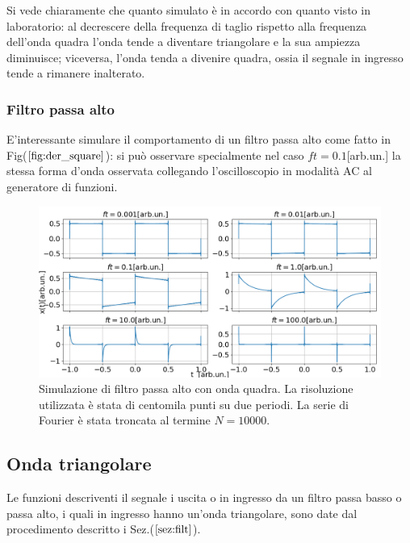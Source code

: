 \documentclass{article}
\begin{document}
                \noindent Si vede chiaramente che quanto simulato è in accordo con quanto
                visto in laboratorio: 
                al decrescere della frequenza di taglio rispetto alla frequenza dell'onda quadra
                l'onda tende a diventare triangolare e la sua ampiezza diminuisce; viceversa,
                l'onda tenda a divenire quadra, ossia il segnale in ingresso tende a 
                rimanere inalterato.
            
            
            \subsubsection{Filtro passa alto}
                E'interessante simulare il comportamento di un filtro passa alto 
                come fatto in Fig($\ref{fig:der_square}$): si  può osservare specialmente 
                nel caso $ft=0.1$[arb.un.] la stessa forma d'onda osservata collegando 
                l'oscilloscopio in modalità AC al generatore di funzioni.
                    \begin{figure}[H]
                        \centering
                        \includegraphics[width=1\textwidth]{der_square.png} %
                        \caption{Simulazione di filtro passa alto con onda quadra.
                        La risoluzione utilizzata è stata di centomila punti su due periodi.
                        La serie di Fourier è stata troncata al termine $N=10000$.}
                        \label{fig:der_square}
                    \end{figure}


    \subsection{Onda triangolare}
    Le funzioni descriventi il segnale i uscita o in ingresso da un filtro passa basso
    o passa alto, i quali in ingresso hanno un'onda triangolare, 
    sono date dal procedimento descritto i Sez.($\ref{sez:filt}$).
\end{document}
